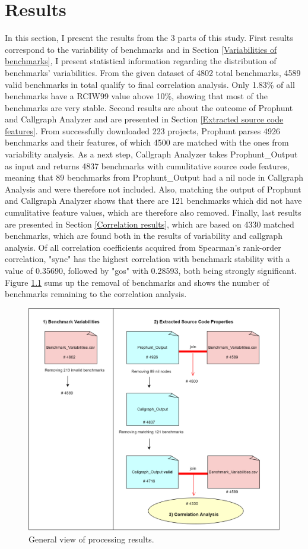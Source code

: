 \documentclass{seal_thesis}
\begin{document}
\chapter{Results}
\label{Results}
In this section, I present the results from the 3 parts of this study. First results correspond to the variability of benchmarks and in Section \ref{Variabilities of benchmarks}, I present statistical information regarding the distribution of benchmarks' variabilities. From the given dataset of 4802 total benchmarks, 4589 valid benchmarks in total qualify to final correlation analysis. Only 1.83\% of all benchmarks have a RCIW99 value above 10\%, showing that most of the benchmarks are very stable. Second results are about the outcome of Prophunt and Callgraph Analyzer and are presented in Section \ref{Extracted source code features}. From successfully downloaded 223 projects, Prophunt parses 4926 benchmarks and their features, of which 4500 are matched with the ones from variability analysis. As a next step, Callgraph Analyzer takes Prophunt\_Output as input and returns 4837 benchmarks with cumulitative source code features, meaning that 89 benchmarks from Prophunt\_Output had a nil node in Callgraph Analysis and were therefore not included. Also, matching the output of Prophunt and Callgraph Analyzer shows that there are 121 benchmarks which did not have cumulitative feature values, which are therefore also removed. Finally, last results are presented in Section \ref{Correlation results}, which are based on 4330 matched benchmarks, which are found both in the results of variability and callgraph analysis. Of all correlation coefficients acquired from Spearman's rank-order correlation, "sync" has the highest correlation with benchmark stability with a value of 0.35690, followed by "gos" with 0.28593, both being strongly significant. Figure \ref{fig:results} sums up the removal of benchmarks and shows the number of benchmarks remaining to the correlation analysis.

\begin{figure}[H]
	\centering
	\includegraphics[width=\linewidth]{ResultsGeneral}
	\caption{General view of processing results.}
	\label{fig:results}
\end{figure}
\end{document}
